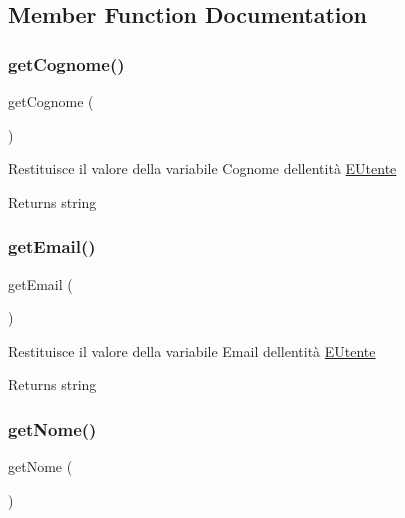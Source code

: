 \subsection{Member Function Documentation}
\mbox{\label{class_e_utente_aa114419de31d6dd2151842ea68f84283}} 
\subsubsection{\texorpdfstring{get\+Cognome()}{getCognome()}}
{\footnotesize\ttfamily get\+Cognome (\begin{DoxyParamCaption}{ }\end{DoxyParamCaption})}

Restituisce il valore della variabile Cognome dell\textquotesingle{}entità \mbox{\hyperlink{class_e_utente}{E\+Utente}}

\begin{DoxyReturn}{Returns}
string 
\end{DoxyReturn}
\mbox{\label{class_e_utente_a02a01849f28e2535e888ae4ec87b20f2}} 
\subsubsection{\texorpdfstring{get\+Email()}{getEmail()}}
{\footnotesize\ttfamily get\+Email (\begin{DoxyParamCaption}{ }\end{DoxyParamCaption})}

Restituisce il valore della variabile Email dell\textquotesingle{}entità \mbox{\hyperlink{class_e_utente}{E\+Utente}}

\begin{DoxyReturn}{Returns}
string 
\end{DoxyReturn}
\mbox{\label{class_e_utente_a67fa74a47af3f2f9eeced7c37c2ef0d3}} 
\subsubsection{\texorpdfstring{get\+Nome()}{getNome()}}
{\footnotesize\ttfamily get\+Nome (\begin{DoxyParamCaption}{ }\end{DoxyParamCaption})}

